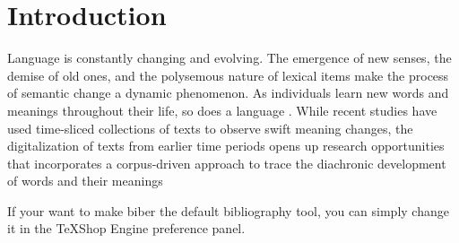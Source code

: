 

\chapter{Introduction}
Language is constantly changing and evolving. The emergence of new senses, the demise of old ones, and the polysemous nature of lexical items make the process of semantic change a dynamic phenomenon. As individuals learn new words and meanings throughout their life, so does a language \parencite{rychly2008lexicographer}. While recent studies have used time-sliced collections of texts to observe swift meaning changes, the digitalization of texts from earlier time periods opens up research opportunities that incorporates a corpus-driven approach to trace the diachronic development of words and their meanings %

If your want to make biber the default bibliography tool, you can simply change it in the TeXShop Engine preference panel.


